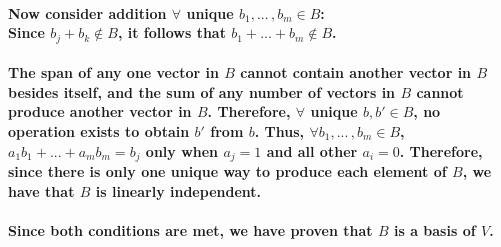 \documentclass{article}
\begin{document}
\paragraph{\large
Now consider addition $\forall$ unique $b_1, ...\,, b_m \in B$:
\\\indent Since $b_j + b_k \notin B$, it follows that $b_1 + ... + b_m \notin B$.}

\paragraph{\large
The span of any one vector in $B$ cannot contain another vector in $B$ besides itself, and the sum of any number of vectors in $B$ cannot produce another vector in $B$. Therefore, $\forall$ unique $b, b' \in B$, no operation exists to obtain $b'$ from $b$. Thus, $\forall b_1, ...\,,b_m \in B$, $a_1b_1 + ... + a_mb_m = b_j$ only when $a_j = 1$ and all other $a_i = 0$. Therefore, since there is only one unique way to produce each element of $B$, we have that $B$ is linearly independent.}

\paragraph{\large
Since both conditions are met, we have proven that $B$ is a basis of $V$.}
\end{document}
